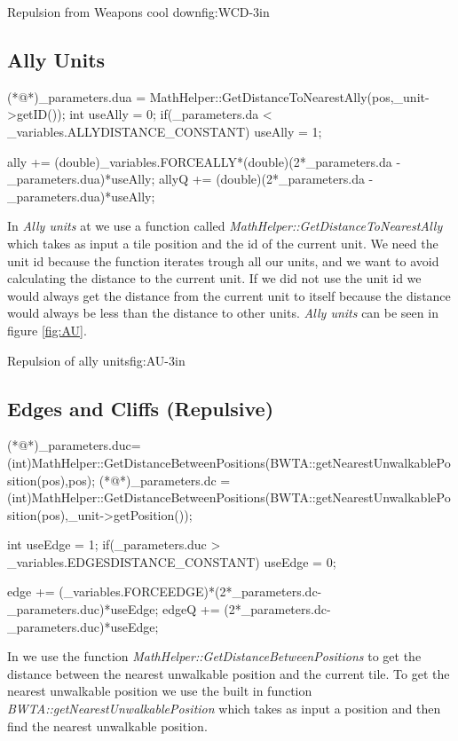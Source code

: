 		{Repulsion from Weapons cool down}{fig:WCD}{-3in}

	\subsection{Ally Units}
		\begin{Sourcecode}[caption=Ally units]
(*@\lnote@*)_parameters.dua = MathHelper::GetDistanceToNearestAlly(pos,_unit->getID());
int useAlly = 0;
if(_parameters.da < _variables.ALLYDISTANCE_CONSTANT)
	useAlly = 1;

ally += (double)_variables.FORCEALLY*(double)(2*_parameters.da - _parameters.dua)*useAlly;
allyQ += (double)(2*_parameters.da - _parameters.dua)*useAlly;
\end{Sourcecode}	
	In \textit{Ally units} at  we use a function called \textit{MathHelper::GetDistanceToNearestAlly} which takes as input a tile position and the id of the current unit. We need the unit id because the function iterates trough all our units, and we want to avoid calculating the distance to the current unit. If we did not use the unit id we would always get the distance from the current unit to itself because the distance would always be less than the distance to other units. \textit{Ally units} can be seen in figure \ref{fig:AU}.
	
			{Repulsion of ally units}{fig:AU}{-3in}


		\pagebreak
	\subsection{Edges and Cliffs (Repulsive)}
	\begin{Sourcecode}[caption=Edges and cliffs]
(*@\lnote@*)_parameters.duc= (int)MathHelper::GetDistanceBetweenPositions(BWTA::getNearestUnwalkablePosition(pos),pos);
(*@\lnote@*)_parameters.dc = (int)MathHelper::GetDistanceBetweenPositions(BWTA::getNearestUnwalkablePosition(pos),_unit->getPosition());

int useEdge = 1;
if(_parameters.duc > _variables.EDGESDISTANCE_CONSTANT)
	useEdge = 0;

edge += (_variables.FORCEEDGE)*(2*_parameters.dc-_parameters.duc)*useEdge;
edgeQ += (2*_parameters.dc-_parameters.duc)*useEdge;
\end{Sourcecode}	
    In  we use the function \textit{MathHelper::GetDistanceBetweenPositions} to get the distance between the nearest unwalkable position and the current tile. To get the nearest unwalkable position we use the built in function \textit{BWTA::getNearestUnwalkablePosition} which takes as input a position and then find the nearest unwalkable position. \\

